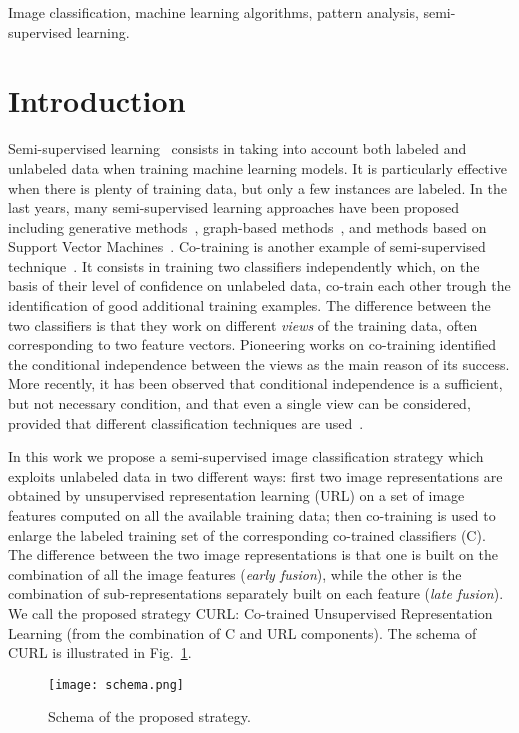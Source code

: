 \documentclass[journal,11pt]{IEEEtran}
\newcommand{\ADD}[1]{#1}
\newcommand{\coso}{strategy}
\begin{document}
\begin{IEEEkeywords}
Image classification, machine learning algorithms, pattern analysis, semi-supervised learning.
\end{IEEEkeywords}



\section{Introduction}
\label{sec:intro}

Semi-supervised learning~\cite{chapelle2006semi} consists in taking
into account both labeled and unlabeled data when training machine
learning models.  It is particularly effective when there is plenty of
training data, but only a few instances are labeled.  In the last
years, many semi-supervised learning approaches have been proposed
including generative methods~\cite{nigam2000text,fujino2005hybrid},
graph-based methods~\cite{blum2001learning,chapelle2002cluster}, and
methods based on Support Vector
Machines~\cite{joachims1999transductive,belkin2006manifold}.
Co-training is another example of semi-supervised
technique~\cite{blum1998combining}.  It consists in training two
classifiers independently which, on the basis of their level of
confidence on unlabeled data, co-train each other trough the
identification of good additional training examples.  The difference
between the two classifiers is that they work on different
\emph{views} of the training data, often corresponding to two feature
vectors.  Pioneering works on co-training identified the conditional
independence between the views as the main reason of its success.
More recently, it has been observed that conditional independence is a
sufficient, but not necessary condition, and that even a single view
can be considered, provided that different classification techniques
are used~\cite{zhou2010semi}.

In this work we propose a semi-supervised image classification
strategy which exploits unlabeled data in two different ways: first
two image representations are obtained by unsupervised representation learning \ADD{(URL)} on a
set of image features computed on all the available training data;
then co-training is used to enlarge the labeled training set of the
corresponding co-trained classifiers \ADD{(C)}.  The difference between the two image
representations is that one is built on the combination of all the
image features (\emph{early fusion}), while the other is the
combination of sub-representations separately built on each feature 
(\emph{late fusion}).  \ADD{We call the proposed strategy CURL: Co-trained Unsupervised Representation Learning  (from the combination of C and URL components). The schema of CURL} is illustrated in
Fig.~\ref{fig:schema}.
%
\begin{figure}%
	\texttt{[image: schema.png]}%
  \caption{Schema of the proposed \coso.}%
  \label{fig:schema}%
\end{figure}
%
\end{document}
